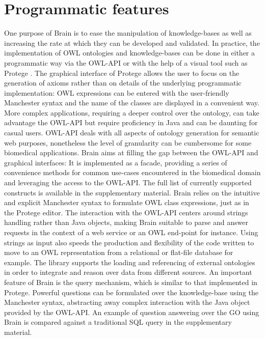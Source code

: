 \documentclass{bioinfo}
\begin{document}
\section{Programmatic features}
One purpose of Brain is to ease the manipulation of knowledge-bases as well as increasing the rate at 
which they can be developed and validated.
In practice, the implementation of OWL ontologies and knowledge-bases can be done in either a programmatic way 
via the OWL-API \citep{MatthewHorridge2011} or with the
help of a visual tool such as Protege \citep{StanfordCenterforBiomedicalInformaticsResearch}. 
The graphical interface of Protege allows the user to focus 
on the generation of axioms rather than on details of the underlying programmatic implementation:
OWL expressions can be entered 
with the user-friendly Manchester syntax \citep{Horridge2006} and the name of the classes are displayed in a convenient way. 
More complex applications, requiring a deeper control over the ontology,
can take advantage the OWL-API but require proficiency in Java and can be daunting for casual users.
OWL-API deals with all aspects of ontology generation for semantic web purposes, nonetheless the 
level of granularity can be cumbersome for some biomedical applications. Brain aims at filling the gap between the OWL-API
and graphical interfaces: It is implemented as a facade, providing a series of convenience methods for common
use-cases encountered in the biomedical domain and leveraging the access to the OWL-API. 
The full list of currently supported constructs is available in the supplementary material.
Brain relies on the intuitive and explicit Manchester syntax to formulate OWL class expressions, just as in the Protege editor.
The interaction with the OWL-API centers around strings handling rather than Java objects, making Brain suitable to parse and answer requests in 
the context of a web service or an OWL end-point for instance. Using strings as input also speeds the production 
and flexibility of the code written to move to an OWL representation from a relational or flat-file database for example.
The library supports the loading and referencing of external ontologies in order to integrate and reason
over data from different sources. An important feature of Brain is the query mechanism, which is similar to 
that implemented in Protege. Powerful questions can be formulated over the knowledge-base using the Manchester syntax, abstracting
away complex interaction with the Java object provided by the OWL-API. An example of question answering over the GO using Brain
is compared against a traditional SQL query in the supplementary material.
\end{document}
